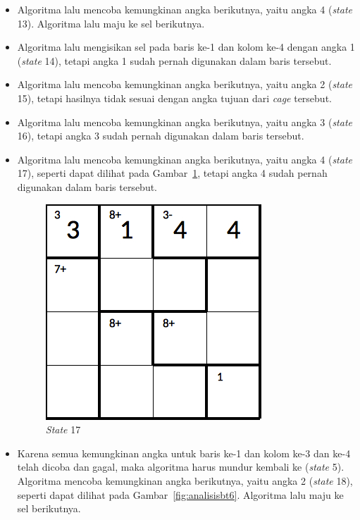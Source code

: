 \documentclass[a4paper,twoside]{article}
\begin{document}
\begin{enumerate}
\begin{itemize}
\item Algoritma lalu mencoba kemungkinan angka berikutnya, yaitu angka 4 (\textit{state} 13). Algoritma lalu maju ke sel berikutnya.
\item Algoritma lalu mengisikan sel pada baris ke-1 dan kolom ke-4 dengan angka 1 (\textit{state} 14), tetapi angka 1 sudah pernah digunakan dalam baris tersebut.
\item Algoritma lalu mencoba kemungkinan angka berikutnya, yaitu angka 2 (\textit{state} 15), tetapi hasilnya tidak sesuai dengan angka tujuan dari \textit{cage} tersebut.
\item Algoritma lalu mencoba kemungkinan angka berikutnya, yaitu angka 3 (\textit{state} 16), tetapi angka 3 sudah pernah digunakan dalam baris tersebut.
\item Algoritma lalu mencoba kemungkinan angka berikutnya, yaitu angka 4 (\textit{state} 17), seperti dapat dilihat pada Gambar~\ref{fig:analisisbt5}, tetapi angka 4 sudah pernah digunakan dalam baris tersebut.

\begin{figure}
\centering
\captionsetup{justification=centering}
\includegraphics[scale=0.333]{Gambar/backtracking/State17}
\caption[\textit{State} 17]{\textit{State} 17}
\label{fig:analisisbt5}
\end{figure}

\item Karena semua kemungkinan angka untuk baris ke-1 dan kolom ke-3 dan ke-4 telah dicoba dan gagal, maka algoritma harus mundur kembali ke (\textit{state} 5). Algoritma mencoba kemungkinan angka berikutnya, yaitu angka 2  (\textit{state} 18), seperti dapat dilihat pada Gambar~\ref{fig:analisisbt6}. Algoritma lalu maju ke sel berikutnya.


\end{itemize}
\end{enumerate}
\end{document}
